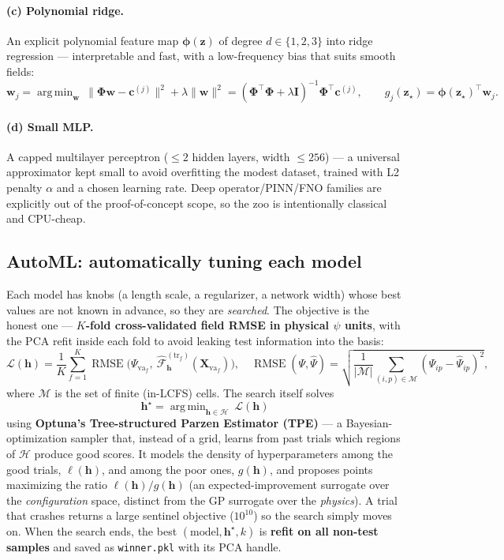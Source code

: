 \documentclass[11pt]{article}
\newcommand{\bz}{\mathbf{z}}
\newcommand{\bc}{\mathbf{c}}
\newcommand{\bw}{\mathbf{w}}
\newcommand{\bI}{\mathbf{I}}
\newcommand{\bPhi}{\bm{\Phi}}
\newcommand{\bphi}{\bm{\phi}}
\newcommand{\Fhat}{\hat{\mathcal{F}}}
\DeclareMathOperator{\RMSE}{RMSE}
\DeclareMathOperator*{\argmin}{arg\,min}
\begin{document}
\paragraph{(c) Polynomial ridge.} An explicit polynomial feature map $\bphi(\bz)$ of degree
$d\in\{1,2,3\}$ into ridge regression --- interpretable and fast, with a low-frequency bias that
suits smooth fields:
\begin{equation}
\bw_j=\argmin_{\bw}\ \|\bPhi\bw-\bc^{(j)}\|^2+\lambda\|\bw\|^2
=(\bPhi^\top\bPhi+\lambda\bI)^{-1}\bPhi^\top\bc^{(j)},
\qquad g_j(\bz_\star)=\bphi(\bz_\star)^\top\bw_j .
\end{equation}

\paragraph{(d) Small MLP.} A capped multilayer perceptron ($\le 2$ hidden layers, width
$\le 256$) --- a universal approximator kept small to avoid overfitting the modest dataset,
trained with L2 penalty $\alpha$ and a chosen learning rate. Deep operator/PINN/FNO families are
explicitly out of the proof-of-concept scope, so the zoo is intentionally classical and
CPU-cheap.

\subsection{AutoML: automatically tuning each model}
\label{sec:automl}
Each model has knobs (a length scale, a regularizer, a network width) whose best values are not
known in advance, so they are \emph{searched}. The objective is the honest one --- \textbf{$K$-fold
cross-validated field RMSE in physical $\psi$ units}, with the PCA refit inside each fold to avoid
leaking test information into the basis:
\begin{equation}
\mathcal{L}(\mathbf{h}) = \frac{1}{K}\sum_{f=1}^{K}
\RMSE\!\Big(\Psi_{\text{va}_f},\ \Fhat_{\mathbf{h}}^{(\text{tr}_f)}(\mathbf{X}_{\text{va}_f})\Big),
\quad
\RMSE(\Psi,\hat\Psi)=\sqrt{\frac{1}{|\mathcal{M}|}\sum_{(i,p)\in\mathcal{M}}(\Psi_{ip}-\hat\Psi_{ip})^2},
\end{equation}
where $\mathcal{M}$ is the set of finite (in-LCFS) cells. The search itself solves
\begin{equation}
\mathbf{h}^\star=\argmin_{\mathbf{h}\in\mathcal{H}}\ \mathcal{L}(\mathbf{h})
\end{equation}
using \textbf{Optuna's Tree-structured Parzen Estimator (TPE)} --- a Bayesian-optimization sampler
that, instead of a grid, learns from past trials which regions of $\mathcal{H}$ produce good
scores. It models the density of hyperparameters among the good trials, $\ell(\mathbf{h})$, and
among the poor ones, $g(\mathbf{h})$, and proposes points maximizing the ratio
$\ell(\mathbf{h})/g(\mathbf{h})$ (an expected-improvement surrogate over the \emph{configuration}
space, distinct from the GP surrogate over the \emph{physics}). A trial that crashes returns a
large sentinel objective ($10^{10}$) so the search simply moves on. When the search ends, the best
$(\text{model},\mathbf{h}^\star,k)$ is \textbf{refit on all non-test samples} and saved as
\texttt{winner.pkl} with its PCA handle.
\end{document}
